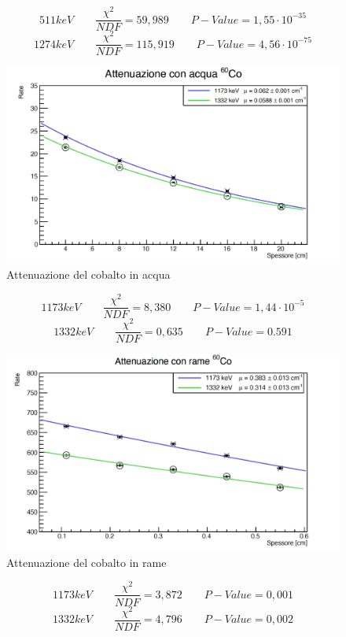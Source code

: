 \documentclass[a4paper,10pt]{article}
\begin{document}
$$
	511 keV \qquad \frac{\chi^2}{NDF}  = 59,989 \qquad P-Value = 1,55\cdot 10^{-35}
$$
$$
	1274 keV \qquad \frac{\chi^2}{NDF}  = 115,919 \qquad P-Value = 4,56\cdot 10^{-75}
$$
\begin{figure}[H]
    \centering
    \includegraphics[scale=0.45]{grafici/attenuazionecobaltoacqua}
    \caption{Attenuazione del cobalto in acqua}
\end{figure}
$$
	1173 keV \qquad \frac{\chi^2}{NDF}  = 8,380 \qquad P-Value = 1,44\cdot 10^{-5}
$$
$$
	1332 keV \qquad \frac{\chi^2}{NDF}  = 0,635 \qquad P-Value = 0.591
$$
\begin{figure}[H]
    \centering
    \includegraphics[scale=0.45]{grafici/attenuazionecobaltorame}
    \caption{Attenuazione del cobalto in rame}
\end{figure}
$$
	1173 keV \qquad \frac{\chi^2}{NDF}  = 3,872 \qquad P-Value = 0,001
$$
$$
	1332 keV \qquad \frac{\chi^2}{NDF}  = 4,796 \qquad P-Value = 0,002
$$
\end{document}
